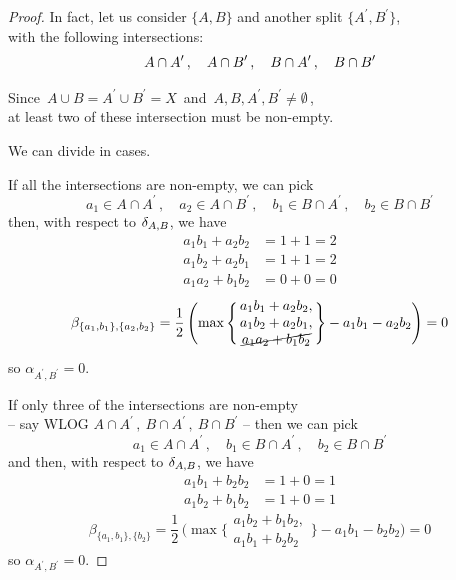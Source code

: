 \documentclass[./main.tex]{subfiles}
\begin{document}
\begin{proof}
    In fact, let us consider $\{A,B\}$ and another split $\{A^\prime,B^\prime\}$, \\
    with the following intersections:
    \[ A \cap A^\prime \,,\quad A \cap B^\prime \,,\quad B \cap A^\prime \,,\quad B \cap B^\prime \nospblw \]

    Since $\, A \cup B = A^\prime \cup B^\prime = X \,$ and $\, A,B,A^\prime,B^\prime \neq \emptyset \,$, \\
    at least two of these intersection must be non-empty.
    
    We can divide in cases. \bigskip

    If all the intersections are non-empty, we can pick
    \[ a_1 \in A \cap A^\prime \,,\quad a_2 \in A \cap B^\prime \,,\quad b_1 \in B \cap A^\prime \,,\quad b_2 \in B \cap B^\prime \]
    then, with respect to $\delta_{A,B}$, we have
    \begin{align*}
        a_1 b_1 + a_2 b_2 &= 1 + 1 = 2 \\
        a_1 b_2 + a_2 b_1 &= 1 + 1 = 2 \\
        a_1 a_2 + b_1 b_2 &= 0 + 0 = 0
    \end{align*}
    \[ \beta_{\{a_1,b_1\},\{a_2,b_2\}} = \frac{1}{2}\, \Biggl( \max {\Biggl\{\!\!
        \begin{array}{c}
            a_1 b_1 + a_2 b_2, \\
            a_1 b_2 + a_2 b_1, \\
            \cancel{a_1 a_2 + b_1 b_2}
        \end{array}
    \!\!\Biggr\}} - a_1 b_1 - a_2 b_2 \Biggr) = 0 \]
    so $\alpha_{A^\prime,B^\prime} = 0$. \bigskip \smallskip

    If only three of the intersections are non-empty \\
    -- say WLOG $A \cap A^\prime \,,\ B \cap A^\prime \,,\ B \cap B^\prime$ -- then we can pick
    \[ a_1 \in A \cap A^\prime \,,\quad b_1 \in B \cap A^\prime \,,\quad b_2 \in B \cap B^\prime \]
    and then, with respect to $\delta_{A,B}$, we have
    \begin{align*}
        a_1 b_1 + b_2 b_2 &= 1 + 0 = 1 \\
        a_1 b_2 + b_1 b_2 &= 1 + 0 = 1
    \end{align*}
    \[ \beta_{\{a_1,b_1\},\{b_2\}} = \frac{1}{2}\, \biggl( \max {\biggl\{\!\!
        \begin{array}{c}
            a_1 b_2 + b_1 b_2, \\
            a_1 b_1 + b_2 b_2
        \end{array}
    \!\!\biggr\}} - a_1 b_1 - b_2 b_2 \biggr) = 0 \]
    so $\alpha_{A^\prime,B^\prime} = 0$. \bigskip \smallskip


\end{proof}
\end{document}
